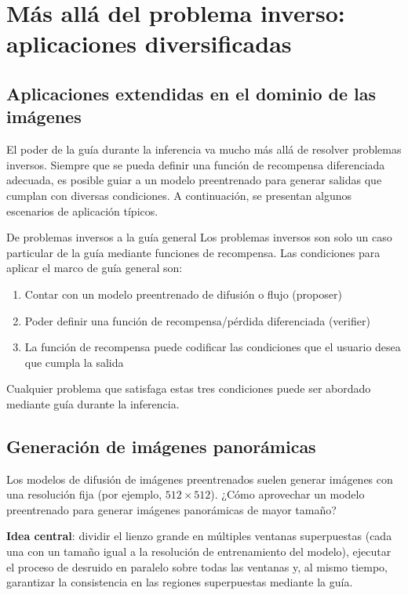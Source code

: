 \section{Más allá del problema inverso: aplicaciones diversificadas}

\subsection{Aplicaciones extendidas en el dominio de las imágenes}

El poder de la guía durante la inferencia va mucho más allá de resolver problemas inversos. Siempre que se pueda definir una función de recompensa diferenciada adecuada, es posible guiar a un modelo preentrenado para generar salidas que cumplan con diversas condiciones. A continuación, se presentan algunos escenarios de aplicación típicos.

\begin{knowledgebox}{De problemas inversos a la guía general}
Los problemas inversos son solo un caso particular de la guía mediante funciones de recompensa. Las condiciones para aplicar el marco de guía general son:
\begin{enumerate}
    \item Contar con un modelo preentrenado de difusión o flujo (proposer)
    \item Poder definir una función de recompensa/pérdida diferenciada (verifier)
    \item La función de recompensa puede codificar las condiciones que el usuario desea que cumpla la salida
\end{enumerate}
Cualquier problema que satisfaga estas tres condiciones puede ser abordado mediante guía durante la inferencia.
\end{knowledgebox}

\subsection{Generación de imágenes panorámicas}

Los modelos de difusión de imágenes preentrenados suelen generar imágenes con una resolución fija (por ejemplo, $512 \times 512$). ¿Cómo aprovechar un modelo preentrenado para generar imágenes panorámicas de mayor tamaño?

\textbf{Idea central}: dividir el lienzo grande en múltiples ventanas superpuestas (cada una con un tamaño igual a la resolución de entrenamiento del modelo), ejecutar el proceso de desruido en paralelo sobre todas las ventanas y, al mismo tiempo, garantizar la consistencia en las regiones superpuestas mediante la guía.

